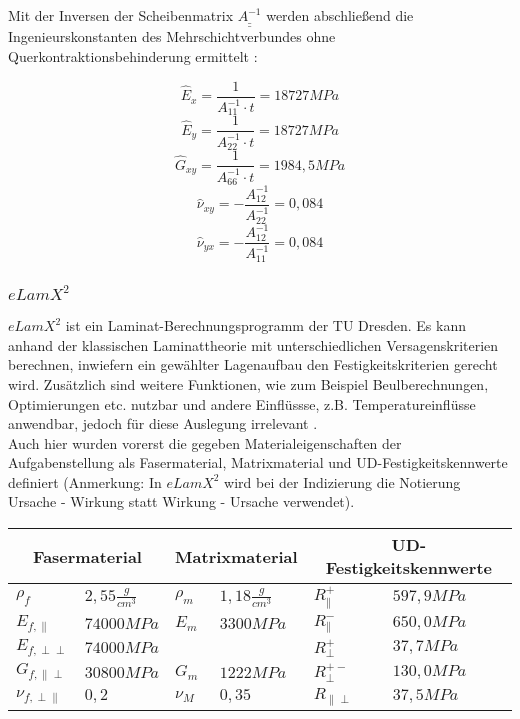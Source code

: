 \noindent Mit der Inversen der Scheibenmatrix $\underline{\underline{A^{-1}}}$ werden abschließend die Ingenieurskonstanten des Mehrschichtverbundes ohne Querkontraktionsbehinderung ermittelt \cite{item3}:

\begin{equation}
	\hat{E}_{x}=\frac{1}{A_{11}^{-1}\cdot t} = 18727 MPa
\end{equation}
\begin{equation}
	\hat{E}_{y}=\frac{1}{A_{22}^{-1}\cdot t} = 18727 MPa
\end{equation}
\begin{equation}
	\hat{G}_{xy}=\frac{1}{A_{66}^{-1}\cdot t} = 1984,5 MPa
\end{equation}
\begin{equation}
	\hat{\nu}_{xy}=-\frac{A_{12}^{-1}}{A_{22}^{-1}} = 0,084
\end{equation}
\begin{equation}
	\hat{\nu}_{yx}=-\frac{A_{12}^{-1}}{A_{11}^{-1}} = 0,084
\end{equation}


\subsubsection{$eLamX^{2}$}\label{elamx}
$eLamX^{2}$ ist ein Laminat-Berechnungsprogramm der TU Dresden. Es kann anhand der klassischen Laminattheorie mit unterschiedlichen Versagenskriterien berechnen, inwiefern ein gewählter Lagenaufbau den Festigkeitskriterien gerecht wird. Zusätzlich sind weitere Funktionen, wie zum Beispiel Beulberechnungen, Optimierungen etc. nutzbar und andere Einflüssse, z.B. Temperatureinflüsse anwendbar, jedoch für diese Auslegung irrelevant \cite{item22}\cite{item3}.\\

\noindent Auch hier wurden vorerst die gegeben Materialeigenschaften der Aufgabenstellung als Fasermaterial, Matrixmaterial und  UD-Festigkeitskennwerte definiert (Anmerkung: In $eLamX^{2}$ wird bei der Indizierung die Notierung \glqq Ursache - Wirkung\grqq\: statt \glqq Wirkung - Ursache\grqq\: verwendet). \cite{item22}\\

\begin{tabular}{ll|ll|ll}
	\multicolumn{2}{c}{Fasermaterial} &\multicolumn{2}{c}{Matrixmaterial}  &\multicolumn{2}{c}{UD-Festigkeitskennwerte} \\
	\hline\hline
	$\rho_{f}$ & $2,55 \frac{g}{cm^{3}}$  & $\rho_{m}$ & $1,18 \frac{g}{cm^{3}}$  & $R_{\parallel}^{+}$ & $597,9MPa$ \\
	\hline
	$E_{f,\parallel}$ & $74000MPa$  & $E_{m}$ & $3300MPa$  & $R_{\parallel}^{-}$ & $650,0MPa$\\
	\hline
	$E_{f,\perp\perp}$ & $74000MPa$  &  &   & $R_{\perp}^{+}$ & $37,7MPa$\\
	\hline
	$G_{f,\parallel\perp}$ & $30800MPa$ & $G_{m}$ & $1222MPa$ & $R_{\perp}^{+-}$ & $130,0MPa$\\
	\hline
	$\nu_{f,\perp\parallel}$ & $0,2$  &$\nu_{M}$ &  $0,35$  & $R_{\parallel\perp}$ & $37,5MPa$\\
\end{tabular}\\

